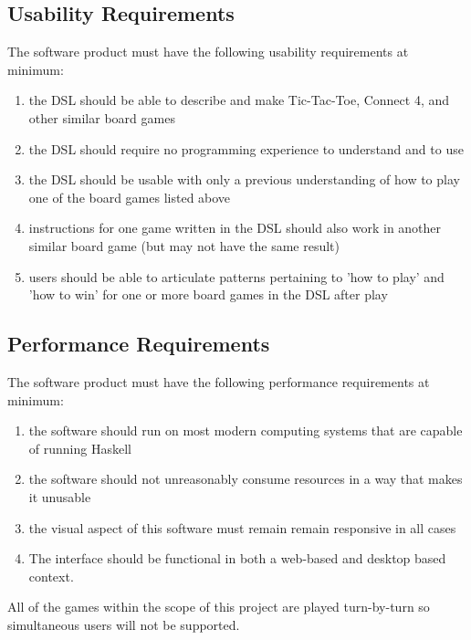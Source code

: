 \documentclass[10pt,letter,draftclsnofoot,onecolumn]{IEEEtran}
\begin{document}
\begin{singlespace}
    \subsection{Usability Requirements}
        The software product must have the following usability requirements at minimum:
        \begin{enumerate}
            \item the DSL should be able to describe and make Tic-Tac-Toe, Connect 4, and other similar board games
	        \item the DSL should require no programming experience to understand and to use
	        \item the DSL should be usable with only a previous understanding of how to play one of the board games listed above
	        \item instructions for one game written in the DSL should also work in another similar board game (but may not have the same result)
	        \item users should be able to articulate patterns pertaining to 'how to play' and 'how to win' for one or more board games in the DSL after play
        \end{enumerate}
    \subsection{Performance Requirements}
        The software product must have the following performance requirements at minimum:
        \begin{enumerate}
            \item the software should run on most modern computing systems that are capable of running Haskell
            \item the software should not unreasonably consume resources in a way that makes it unusable
            \item the visual aspect of this software must remain remain responsive in all cases
            \item The interface should be functional in both a web-based and desktop based context.
        \end{enumerate}
        
        All of the games within the scope of this project are played turn-by-turn so simultaneous users will not be supported. 

\end{singlespace}
\end{document}
